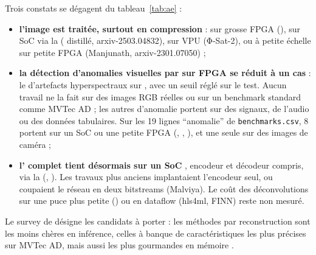 Trois constats se dégagent du tableau~\ref{tab:ae} :
\begin{itemize}
  \item \textbf{l'image est traitée, surtout en compression} : sur grosse FPGA (), sur
    SoC via la  ( distillé, arxiv-2503.04832\pp), sur VPU (Φ-Sat-2), ou à petite
    échelle sur petite FPGA (Manjunath, arxiv-2301.07050\pp) ;
  \item \textbf{la détection d'anomalies visuelles par  sur FPGA se réduit à un cas} :
    le  d'artefacts hyperspectraux sur , avec un seuil réglé sur le test. Aucun
    travail ne la fait sur des images RGB réelles ou sur un benchmark standard comme
    MVTec AD ; les autres  d'anomalie portent sur des signaux, de l'audio ou des données
    tabulaires. Sur les 19 lignes \enquote{anomalie} de \texttt{benchmarks.csv}, 8 portent
    sur un SoC ou une petite FPGA (, , ), et une seule sur
    des images de caméra ;
  \item \textbf{l' complet tient désormais sur un SoC }, encodeur et décodeur
    compris, via la  (, ). Les travaux plus anciens implantaient l'encodeur
    seul, ou coupaient le réseau en deux bitstreams (Malviya). Le coût des déconvolutions
    sur une puce plus petite () ou en dataflow (hls4ml, FINN) reste non mesuré.
\end{itemize}
Le survey de \citet{2023-cui-survey-unsupervised-anomaly-detection-algorithms} désigne les
candidats à porter : les méthodes par reconstruction sont les moins chères en inférence,
celles à banque de caractéristiques les plus précises sur MVTec AD, mais aussi les plus
gourmandes en mémoire .
